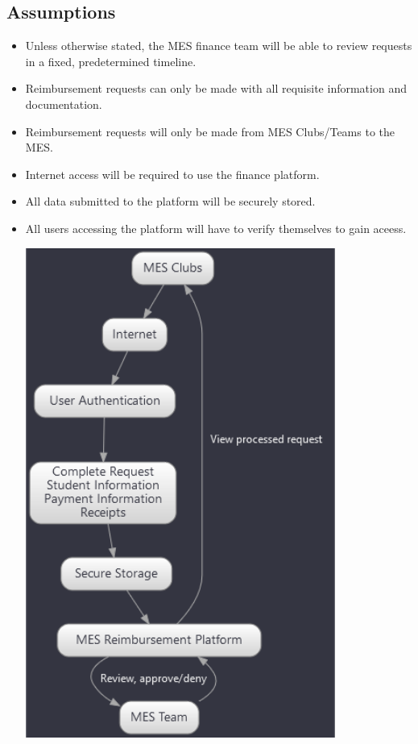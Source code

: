 \documentclass[12pt]{article}
\begin{document}
\subsection{Assumptions}
\begin{itemize}
    \item Unless otherwise stated, the MES finance team will be able to review requests in a fixed, predetermined timeline.
    \item Reimbursement requests can only be made with all requisite information and documentation.
    \item Reimbursement requests will only be made from MES Clubs/Teams to the MES.
    \item Internet access will be required to use the finance platform.
    \item All data submitted to the platform will be securely stored.
    \item All users accessing the platform will have to verify themselves to gain aceess.

    \includegraphics[width=0.8\textwidth]{imgs/assumptions.png}
\end{itemize}
\end{document}
